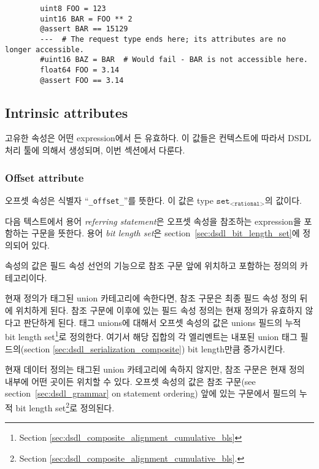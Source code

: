 \begin{remark}
    \begin{verbatim}
        uint8 FOO = 123
        uint16 BAR = FOO ** 2
        @assert BAR == 15129
        ---  # The request type ends here; its attributes are no longer accessible.
        #uint16 BAZ = BAR  # Would fail - BAR is not accessible here.
        float64 FOO = 3.14
        @assert FOO == 3.14
    \end{verbatim}
\end{remark}

\subsection{Intrinsic attributes}

고유한 속성은 어떤 expression에서 든 유효하다.
이 값들은 컨텍스트에 따라서 DSDL 처리 툴에 의해서 생성되며,
이번 섹션에서 다룬다.

\subsubsection{Offset attribute}

오프셋 속성은 식별자 ``\verb|_offset_|''를 뜻한다.
이 값은 type $\texttt{set}_\texttt{<rational>}$의 값이다.

다음 텍스트에서 용어 \emph{referring statement}은 오프셋 속성을 참조하는 expression을 포함하는 구문을 뜻한다.
용어 \emph{bit length set}은 section~\ref{sec:dsdl_bit_length_set}에 정의되어 있다.

속성의 값은 필드 속성 선언의 기능으로 참조 구문 앞에 위치하고 포함하는 정의의 카테고리이다.

현재 정의가 태그된 union 카테고리에 속한다면,
참조 구문은 최종 필드 속성 정의 뒤에 위치하게 된다.
참조 구문에 이후에 있는 필드 속성 정의는 현재 정의가 유효하지 않다고 판단하게 된다.
태그 unions에 대해서 오프셋 속성의 값은 unions 필드의 누적 bit length set\footnote{Section \ref{sec:dsdl_composite_alignment_cumulative_bls}}로 정의한다. 여기서 해당 집합의 각 엘리멘트는 내포된 union 태그 필드의(section \ref{sec:dsdl_serialization_composite}) bit length만큼 증가시킨다.

현재 데이터 정의는 태그된 union 카테고리에 속하지 않지만,
참조 구문은 현재 정의 내부에 어떤 곳이든 위치할 수 있다.
오프셋 속성의 값은 참조 구문(see section~\ref{sec:dsdl_grammar} on statement ordering) 앞에 있는 구문에서 필드의 누적 bit length set\footnote{Section \ref{sec:dsdl_composite_alignment_cumulative_bls}.}로 정의된다.

